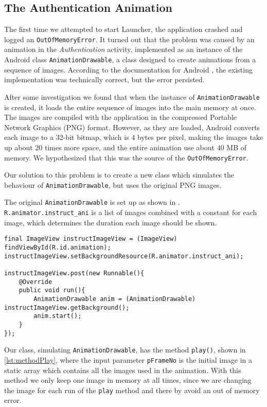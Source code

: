 \subsection{The Authentication Animation}
The first time we attempted to start Launcher, the application crashed and logged an \lstinline{OutOfMemoryError}.
It turned out that the problem was caused by an animation in the \textit{Authentication} activity, implemented as an instance of the Android class \lstinline{AnimationDrawable}, a class designed to create animations from a sequence of images.
According to the documentation for Android \citet{androidreference}, the existing implementation was technically correct, but the error persisted.

After some investigation we found that when the instance of \lstinline{AnimationDrawable} is created, it loads the entire sequence of images into the main memory at once.
The images are compiled with the application in the compressed Portable Network Graphics (PNG) format.
However, as they are loaded, Android converts each image to a 32-bit bitmap, which is 4 bytes per pixel, making the images take up about 20 times more space, and the entire animation use about 40 MB of memory. We hypothesized that this was the source of the \lstinline{OutOfMemoryError}.

Our solution to this problem is to create a new class which simulates the behaviour of \lstinline{AnimationDrawable}, but uses the original PNG images.

The original \lstinline{AnimationDrawable} is set up as shown in . 
\lstinline{R.animator.instruct_ani} is a list of images combined with a constant for each image, which determines the duration each image should be shown.

\begin{lstlisting}[caption={The original animation implementation, using \lstinline{AnimationDrawable}.},label={lst:animationDrawable}]
final ImageView instructImageView = (ImageView) findViewById(R.id.animation);
instructImageView.setBackgroundResource(R.animator.instruct_ani);

instructImageView.post(new Runnable(){
    @Override
    public void run(){
        AnimationDrawable anim = (AnimationDrawable) instructImageView.getBackground();
        anim.start();
    }
});
\end{lstlisting}

Our class, simulating \lstinline{AnimationDrawable}, has the method \lstinline{play()}, shown in \cref{lst:methodPlay}, where the input parameter \lstinline{pFrameNo} is the initial image in a static array which contains all the images used in the animation. 
With this method we only keep one image in memory at all times, since we are changing the image for each run of the \lstinline{play} method and there by avoid an out of memory error.

